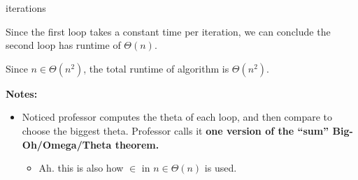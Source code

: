 \documentclass[12pt]{article}
\begin{document}
\begin{enumerate}[a.]
\begin{mdframed}
        iterations

        \bigskip

        \color{red}
        Since the first loop takes a constant time per iteration, we can conclude
        the second loop has runtime of $\Theta(n)$.
        \color{black}

        \bigskip

        \color{red}
        Since $n \in \Theta(n^2)$, the total runtime of algorithm is $\Theta(n^2)$.
        \color{black}

    \end{mdframed}

    \bigskip

    \textbf{Notes:}

    \begin{itemize}
        \item Noticed professor computes the theta of each loop, and then compare
        to choose the biggest theta. Professor calls it \textbf{one version of
        the “sum” Big-Oh/Omega/Theta theorem.}

        \begin{itemize}
            \item Ah. this is also how $\in$ in $n \in \Theta(n)$ is used.
        \end{itemize}

    \end{itemize}

\end{enumerate}
\end{document}
